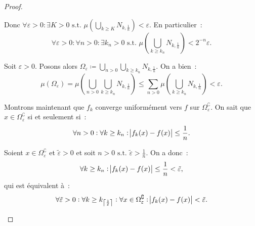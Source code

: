 \documentclass{article}
\theoremstyle{definition}
\newcommand{\st}{\text{ s.t. }}
\newcommand{\C}{\complement}
\begin{document}
\begin{proof}
\begin{enumerate}
	Donc $\forall \varepsilon > 0 : \exists K > 0 \st \mu(\bigcup_{k \geq K}N_{k,\frac 1n}) < \varepsilon$. En particulier~:
	\[\forall \varepsilon > 0 : \forall n > 0 : \exists k_n > 0 \st \mu\left(\bigcup_{k \geq k_n}N_{k,\frac 1n}\right) < 2^{-n}\varepsilon.\]

	Soit $\varepsilon > 0$. Posons alors $\Omega_\varepsilon \coloneqq \bigcup_{n > 0}\bigcup_{k \geq k_n}N_{k,\frac 1n}$. On a bien~:
	\[\mu(\Omega_\varepsilon) = \mu\left(\bigcup_{n > 0}\bigcup_{k \geq k_n}N_{k,\frac 1n}\right) \leq \sum_{n > 0}\mu\left(\bigcup_{k \geq k_n}N_{k,\frac 1n}\right) < \varepsilon.\]

	Montrons maintenant que $f_k$ converge uniformément vers $f$ sur $\Omega_\varepsilon^\C$. On sait que $x \in \Omega_\varepsilon^\C$ si et seulement si~:
	\[\forall n > 0 : \forall k \geq k_n : \abs {f_k(x)-f(x)} \leq \frac 1n.\]

	Soient $x \in \Omega_\varepsilon^\C$ et $\tilde \varepsilon > 0$ et soit $n > 0 \st \tilde \varepsilon > \frac 1n$. On a donc~:
	\[\forall k \geq k_n : \abs {f_k(x)-f(x)} \leq \frac 1n < \tilde \varepsilon,\]
	qui est équivalent à~:
	\[\forall \tilde \varepsilon > 0 : \forall k \geq k_{\left\lceil\frac 1{\tilde \varepsilon}\right\rceil} : \forall x \in \Omega_\varepsilon^\C : \abs {f_k(x)-f(x)} < \tilde\varepsilon.\]
\end{enumerate}
\end{proof}
\end{document}
